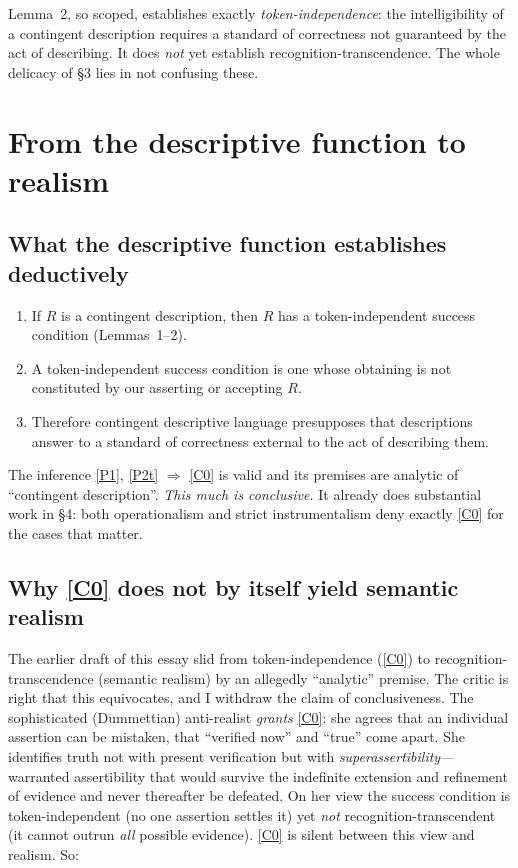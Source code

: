 \documentclass[12pt]{article}
\begin{document}
Lemma~2, so scoped, establishes exactly \emph{token-independence}: the
intelligibility of a contingent description requires a standard of
correctness not guaranteed by the act of describing. It does \emph{not}
yet establish recognition-transcendence. The whole delicacy of \S3 lies
in not confusing these.

\section{From the descriptive function to realism}

\subsection{What the descriptive function establishes deductively}

\begin{enumerate}[label=(P\arabic*),leftmargin=2.4em]
\item\label{P1} If $R$ is a contingent description, then $R$ has a
token-independent success condition (Lemmas~1--2).
\item\label{P2t} A token-independent success condition is one whose
obtaining is not constituted by our asserting or accepting $R$.
\item\label{C0} Therefore contingent descriptive language presupposes
that descriptions answer to a standard of correctness external to the act
of describing them.
\end{enumerate}

The inference \ref{P1}, \ref{P2t} $\Rightarrow$ \ref{C0} is valid and its
premises are analytic of ``contingent description''. \emph{This much is
conclusive.} It already does substantial work in \S4: both operationalism
and strict instrumentalism deny exactly \ref{C0} for the cases that
matter.

\subsection{Why \ref{C0} does not by itself yield semantic realism}

The earlier draft of this essay slid from token-independence (\ref{C0})
to recognition-transcendence (semantic realism) by an allegedly
``analytic'' premise. The critic is right that this equivocates, and I
withdraw the claim of conclusiveness. The sophisticated (Dummettian)
anti-realist \emph{grants} \ref{C0}: she agrees that an individual
assertion can be mistaken, that ``verified now'' and ``true'' come apart.
She identifies truth not with present verification but with
\emph{superassertibility}---warranted assertibility that would survive the
indefinite extension and refinement of evidence and never thereafter be
defeated. On her view the success condition is token-independent
(no one assertion settles it) yet \emph{not} recognition-transcendent (it
cannot outrun \emph{all} possible evidence). \ref{C0} is silent between
this view and realism. So:
\end{document}
